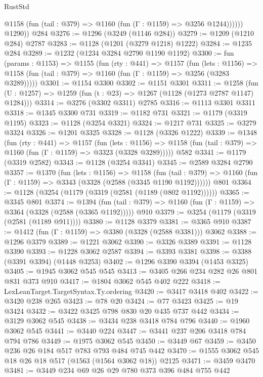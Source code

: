 \begin{lexlean}{RustStd}
\begin{coremodule}
              @1158 (fun (tail : @379) => @1160 (fun (Γ : @1159) => @3256 @1244))))))
        @1290))
    @284
@3276 := @1296 (@3249 (@1146 @284))
@3279 := @1209 (@1210 @284) @2787
@3283 := @1128 (@1201 (@3279 @1218) @1222)
@3284 := @1235 @284
@3289 := @1232 (@1234 @3284 @2790 @1190 @1192)
@3300 := fun (params : @1153) =>
  @1155
    (fun (rty : @441) =>
    @1157
      (fun (lets : @1156) =>
      @1158 (fun (tail : @379) => @1160 (fun (Γ : @1159) => @3256 (@3283 @3289)))))
@3301 := @1154 @3300
@3302 := @1151 @3301
@3311 := @1258 (fun (U : @1257) => @1259 (fun (t : @23) => @1267 (@1128 (@1273 @2787 @1147) @1284)))
@3314 := @3276 (@3302 @3311) @2785
@3316 := @1113 @3301 @3311
@3318 := @1345 @3300 @731
@3319 := @1182 @731
@3321 := @1179 (@3319 @1195)
@3323 := @1128 (@3254 @3321)
@3324 := @1217 @731
@3325 := @3279 @3324
@3326 := @1201 @3325
@3328 := @1128 (@3326 @1222)
@3339 := @1348
    (fun (rty : @441) =>
    @1157
      (fun (lets : @1156) =>
      @1158 (fun (tail : @379) => @1160 (fun (Γ : @1159) => @3323 (@3328 @3289)))))
    @582
@3341 := @1179 (@3319 @2582)
@3343 := @1128 (@3254 @3341)
@3345 := @2589 @3284 @2790
@3357 := @1370
    (fun (lets : @1156) =>
    @1158
      (fun (tail : @379) => @1160 (fun (Γ : @1159) => @3343 (@3328 (@2588 (@3345 @1190 @1192))))))
    @801
@3364 := @1128 (@3254 (@1179 (@3319 (@2581 (@1189 (@802 @1192))))))
@3365 := @3345 @801
@3374 := @1394
    (fun (tail : @379) => @1160 (fun (Γ : @1159) => @3364 (@3328 (@2588 (@3365 @1192)))))
    @910
@3379 := @3254 (@1179 (@3319 (@2581 (@1189 @911))))
@3380 := @1128 @3379
@3381 := @3365 @910
@3387 := @1412 (fun (Γ : @1159) => @3380 (@3328 (@2588 @3381))) @3062
@3388 := @1296 @3379
@3389 := @1221 @3062
@3390 := @3326 @3389
@3391 := @1128 @3390
@3393 := @1228 @3062 @2587
@3394 := @3393 @3381
@3398 := @3388 (@3391 @3394) (@1448 @3253)
@3402 := @1296 @3390 @3394 (@1453 @3325)
@3405 := @1945 @3062 @545 @545
@3413 := @3405 @266 @234 @282 @26 @801 @831 @373 @910
@3417 := @1804 @3062 @545 @402 @222
@3418 := LexLeanTarget.TargetSyntax.Ty.ordering
@3420 := @3417 @3418 @402
@3422 := @3420 @238 @265
@3423 := @78 @20
@3424 := @77 @3423
@3425 := @19 @3424
@3432 := @3422 @3425 @798 @830 @20 @435 @737 @442
@3434 := @3129 @3062 @545
@3438 := @3434 @238 @3418 @784 @796
@3440 := @1960 @3062 @545
@3441 := @3440 @224
@3447 := @3441 @237 @206 @3418 @784 @794 @786
@3449 := @1975 @3062 @545
@3450 := @3449 @67
@3459 := @3450 @236 @26 @184 @517 @783 @793 @484 @745 @442
@3470 := @1555 @3062 @545 @18 @26 @18 @517 (@1563 (@1564 @3062 @18)) @2125
@3471 := @3459 @3470
@3481 := @3449 @234 @69 @26 @29 @780 @373 @396 @484 @755 @442

\end{coremodule}
\end{lexlean}

